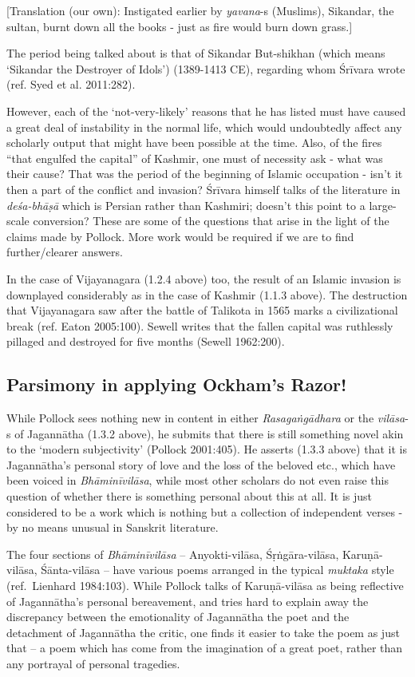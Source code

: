 [Translation (our own): Instigated earlier by {\sl yavana}-s (Muslims), Sikandar, the sultan, burnt down all the books - just as fire would burn down grass.]

The period being talked about is that of Sikandar But-shikhan (which means ‘Sikandar the Destroyer of Idols’) (1389-1413 CE), regarding whom Śrīvara wrote (ref. Syed et al. 2011:282).

However, each of the ‘not-very-likely’ reasons that he has listed must have caused a great deal of instability in the normal life, which would undoubtedly affect any scholarly output that might have been possible at the time. Also, of the fires “that engulfed the capital” of Kashmir, one must of necessity ask - what was their cause? That was the period of the beginning of Islamic occupation - isn’t it then a part of the conflict and invasion? Śrīvara himself talks of the literature in {\sl deśa-bhāṣā} which is Persian rather than Kashmiri; doesn’t this point to a large-scale conversion? These are some of the questions that arise in the light of the claims made by Pollock. More work would be required if we are to find further/clearer answers.

In the case of Vijayanagara (1.2.4 above) too, the result of an Islamic invasion is downplayed considerably as in the case of Kashmir (1.1.3 above). The destruction that Vijayanagara saw after the battle of Talikota in 1565 marks a civilizational break (ref. Eaton 2005:100). Sewell writes that the fallen capital was ruthlessly pillaged and destroyed for five months (Sewell 1962:200).

\subsection{Parsimony in applying Ockham’s Razor!}

While Pollock sees nothing new in content in either {\sl Rasagaṅgādhara} or the {\sl vilāsa}-s of Jagannātha (1.3.2 above), he submits that there is still something novel akin to the ‘modern subjectivity’ (Pollock 2001:405). He asserts (1.3.3 above) that it is Jagannātha’s personal story of love and the loss of the beloved etc., which have been voiced in {\sl Bhāminīvilāsa}, while most other scholars do not even raise this question of whether there is something personal about this at all.  It is just considered to be a work which is nothing but a collection of independent verses - by no means unusual in Sanskrit literature.
\newpage

The four sections of {\sl Bhāminīvilāsa} – Anyokti-vilāsa, Śṛṅgāra-vilāsa, Karuṇā-vilāsa, Śānta-vilāsa – have various poems arranged in the typical {\sl muktaka} style (ref.\ Lienhard 1984:103). While Pollock talks of Karuṇā-vilāsa as being reflective of Jagannātha’s personal bereavement, and tries hard to explain away the discrepancy between the emotionality of Jagannātha the poet and the detachment of Jagannātha the critic, one finds it easier to take the poem as just that – a poem which has come from the imagination of a great poet, rather than any portrayal of personal tragedies. 
\vskip 2pt

